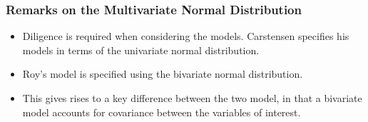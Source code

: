 \documentclass[compress]{beamer}        %
\begin{document}
\begin{frame}
\frametitle{Remarks on the Multivariate Normal Distribution}
\begin{itemize}
\item Diligence is required when considering the models. Carstensen specifies his models in terms of the univariate normal distribution. \item Roy's model is specified using the bivariate normal distribution.
\item 
This gives rises to a key difference between the two model, in that a bivariate model accounts for covariance between the variables of interest.
\end{itemize}
\end{frame}







\end{document}

